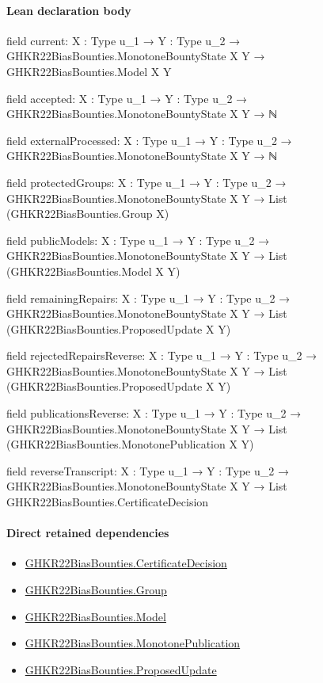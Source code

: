 \documentclass[10pt]{article}
\begin{document}
\paragraph{Lean declaration body}
\begin{ReviewVerbatim}
field current:
{X : Type u_1} → {Y : Type u_2} → GHKR22BiasBounties.MonotoneBountyState X Y → GHKR22BiasBounties.Model X Y

field accepted:
{X : Type u_1} → {Y : Type u_2} → GHKR22BiasBounties.MonotoneBountyState X Y → ℕ

field externalProcessed:
{X : Type u_1} → {Y : Type u_2} → GHKR22BiasBounties.MonotoneBountyState X Y → ℕ

field protectedGroups:
{X : Type u_1} → {Y : Type u_2} → GHKR22BiasBounties.MonotoneBountyState X Y → List (GHKR22BiasBounties.Group X)

field publicModels:
{X : Type u_1} → {Y : Type u_2} → GHKR22BiasBounties.MonotoneBountyState X Y → List (GHKR22BiasBounties.Model X Y)

field remainingRepairs:
{X : Type u_1} →
  {Y : Type u_2} → GHKR22BiasBounties.MonotoneBountyState X Y → List (GHKR22BiasBounties.ProposedUpdate X Y)

field rejectedRepairsReverse:
{X : Type u_1} →
  {Y : Type u_2} → GHKR22BiasBounties.MonotoneBountyState X Y → List (GHKR22BiasBounties.ProposedUpdate X Y)

field publicationsReverse:
{X : Type u_1} →
  {Y : Type u_2} → GHKR22BiasBounties.MonotoneBountyState X Y → List (GHKR22BiasBounties.MonotonePublication X Y)

field reverseTranscript:
{X : Type u_1} →
  {Y : Type u_2} → GHKR22BiasBounties.MonotoneBountyState X Y → List GHKR22BiasBounties.CertificateDecision
\end{ReviewVerbatim}

\paragraph{Direct retained dependencies}
\begin{itemize}\raggedright
\item \hyperlink{governing-declaration-7881732e3fc3c15e}{GHKR22\allowbreak{}Bias\allowbreak{}Bounties.\allowbreak{}Certificate\allowbreak{}Decision}
\item \hyperlink{paper-prerequisite-cc7214115b27106f}{GHKR22\allowbreak{}Bias\allowbreak{}Bounties.\allowbreak{}Group}
\item \hyperlink{paper-prerequisite-333127605c12eba8}{GHKR22\allowbreak{}Bias\allowbreak{}Bounties.\allowbreak{}Model}
\item \hyperlink{governing-declaration-216f0cb76433b185}{GHKR22\allowbreak{}Bias\allowbreak{}Bounties.\allowbreak{}Monotone\allowbreak{}Publication}
\item \hyperlink{governing-declaration-e47349c87d11953f}{GHKR22\allowbreak{}Bias\allowbreak{}Bounties.\allowbreak{}Proposed\allowbreak{}Update}
\end{itemize}
\hypertarget{governing-declaration-ab9b48781fb661af}{}
\end{document}

